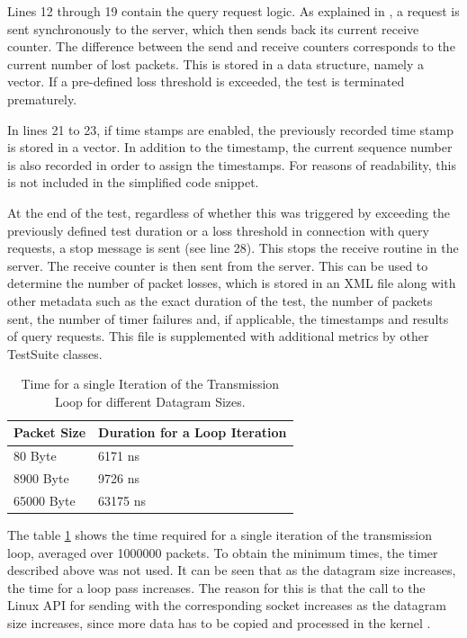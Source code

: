 Lines 12 through 19 contain the query request logic. As explained in \label{chap:targetcom:query}, a request is sent synchronously to the server, which then sends back its current receive counter. The difference between the send and receive counters corresponds to the current number of lost packets. This is stored in a data structure, namely a vector. If a pre-defined loss threshold is exceeded, the test is terminated prematurely.

In lines 21 to 23, if time stamps are enabled, the previously recorded time stamp is stored in a vector. In addition to the timestamp, the current sequence number is also recorded in order to assign the timestamps. For reasons of readability, this is not included in the simplified code snippet.

At the end of the test, regardless of whether this was triggered by exceeding the previously defined test duration or a loss threshold in connection with query requests, a stop message is sent (see line 28). This stops the receive routine in the server. The receive counter is then sent from the server. This can be used to determine the number of packet losses, which is stored in an XML file along with other metadata such as the exact duration of the test, the number of packets sent, the number of timer failures and, if applicable, the timestamps and results of query requests. This file is supplemented with additional metrics by other TestSuite classes.

\begin{table}[h]
\centering
\begin{tabular}{ll}
	\toprule
	Packet Size & Duration for a Loop Iteration \\
	\midrule
	80 Byte & 6171 ns\\
	8900 Byte & 9726 ns\\
	65000 Byte & 63175 ns\\
	\bottomrule
\end{tabular}
\caption{Time for a single Iteration of the Transmission Loop for different Datagram Sizes.}
\label{tab:senditertime}
\end{table}

The table \ref{tab:senditertime} shows the time required for a single iteration of the transmission loop, averaged over 1000000 packets. To obtain the minimum times, the timer described above was not used. It can be seen that as the datagram size increases, the time for a loop pass increases. The reason for this is that the call to the Linux API for sending with the corresponding socket increases as the datagram size increases, since more data has to be copied and processed in the kernel \cite{tsgen03}.

